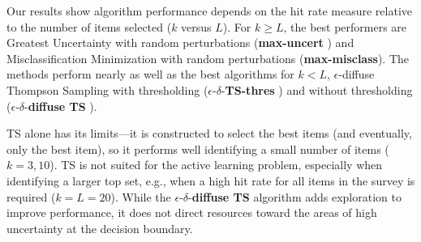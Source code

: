 \documentclass[nonblindrev]{informs3}
\newcommand{\mismin}{\textbf{max-misclass}}
\newcommand{\edts}{$\epsilon$-$\delta$-\textbf{diffuse TS} }
\newcommand{\edtsthres}{$\epsilon$-$\delta$-\textbf{TS-thres} }
\newcommand{\uncert}{\textbf{max-uncert} }
\newcommand{\numperset}{L}
\begin{document}

Our results show algorithm performance depends on the hit rate measure relative to the number of items selected ($k$ versus $\numperset$). For $k \ge L$, the best performers are Greatest Uncertainty with random perturbations (\uncert) and Misclassification Minimization with random perturbations (\mismin). The methods perform nearly as well as the best algorithms for $k < L$, $\epsilon$-diffuse Thompson Sampling with thresholding (\edtsthres) and without thresholding (\edts).

TS alone has its limits---it is constructed to select the best items (and eventually, only the best item), so it performs well identifying a small number of items ($k=3,10$). TS is not suited for the active learning problem, especially when identifying a larger top set, e.g., when a high hit rate for all items in the survey is required ($k=L=20$). While the \edts algorithm adds exploration to improve performance, it does not direct resources toward the areas of high uncertainty at the decision boundary.
\end{document}

